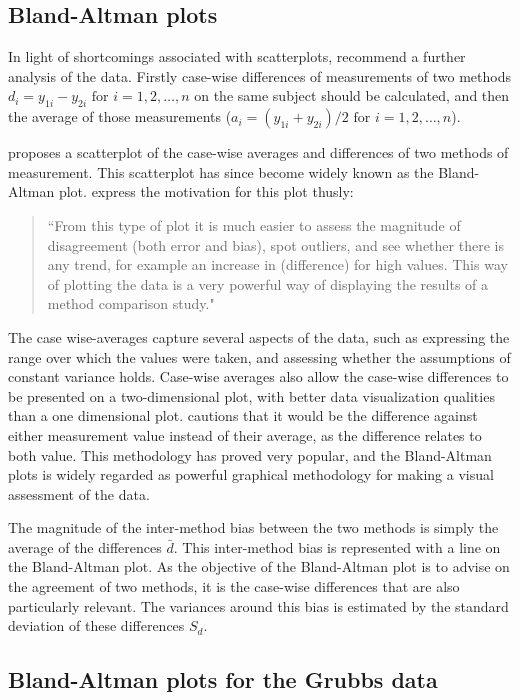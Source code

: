 \documentclass[12pt, a4paper]{report}
\theoremstyle{plain}
\theoremstyle{definition}
\theoremstyle{remark}
\begin{document}
	\subsection{Bland-Altman plots}
	
	In light of shortcomings associated with scatterplots, \citet*{BA83} recommend a further analysis of the data. Firstly
	case-wise differences of measurements of two methods $d_{i} = y_{1i}-y_{2i} \mbox{ for }i=1,2,\dots,n$ on the same subject
	should be calculated, and then the average of those measurements ($a_{i} = (y_{1i} + y_{2i})/2 \mbox{ for }i=1,2,\dots, n$).
	
	\citet{BA83} proposes a scatterplot of the case-wise averages and differences of two methods of measurement. This scatterplot has since become widely known as the Bland-Altman plot. \citet*{BA83} express the
	motivation for this plot thusly:
	\begin{quote}
		``From this type of plot it is much easier to assess the magnitude
		of disagreement (both error and bias), spot outliers, and see
		whether there is any trend, for example an increase in (difference) for high values. This way of plotting the data is a very powerful way of displaying the results of a method comparison study."
	\end{quote}
	
	The case wise-averages capture several aspects of the data, such as expressing the range over which the values were taken, and assessing whether the assumptions of constant variance holds.
	Case-wise averages also allow the case-wise differences to be presented on a two-dimensional plot, with better data visualization qualities than a one dimensional plot. \citet{BA86}
	cautions that it would be the difference against either measurement value instead of their average, as the difference relates to both value. This methodology has proved very popular, and the Bland-Altman plots is widely regarded as powerful graphical methodology for making a visual assessment of the data.
	
	The magnitude of the inter-method bias between the two methods is simply the average of the differences $\bar{d}$. This inter-method bias is represented with a line on the Bland-Altman plot. As the objective of the Bland-Altman plot is to advise on the agreement of two methods, it is the case-wise differences that are also particularly relevant. The variances around this bias is estimated by the standard deviation of these differences $S_{d}$.
	
	\subsection{Bland-Altman plots for the Grubbs data}
	
\end{document}
